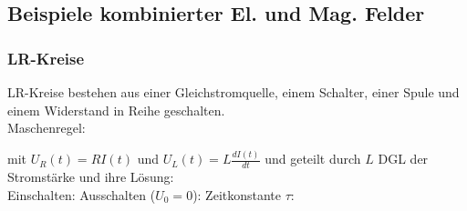 \subsection{Beispiele kombinierter El. und Mag. Felder}
    \subsubsection{LR-Kreise}
        LR-Kreise bestehen aus einer Gleichstromquelle, einem Schalter, einer Spule und einem Widerstand in Reihe geschalten.\\
        Maschenregel:

        mit $U_R(t) = R I(t)$ und $U_L(t) = L \frac{dI(t)}{dt}$ und geteilt durch $L$
        DGL der Stromstärke und ihre Lösung:\\
        Einschalten:
        Ausschalten ($U_0 = 0$):
        Zeitkonstante $\tau$:
        \vspace{0.5em}